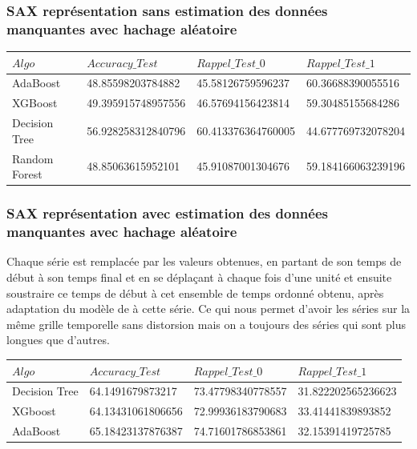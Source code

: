 \documentclass[french]{report}
\begin{document}
\subsubsection{SAX représentation sans estimation des données manquantes avec hachage aléatoire}
\begin{table}[H]
	\begin{tabular} {|l|l|l|l|}%
		\hline
		$Algo$ & $Accuracy\_Test$ & $Rappel\_Test\_0 $ & $Rappel\_Test\_1$\\
		\hline
		AdaBoost & 48.85598203784882 & 45.58126759596237 & 60.36688390055516 \\
		\hline
		XGBoost & 49.395915748957556 & 46.57694156423814 & 59.30485155684286 \\
		\hline
		Decision Tree & 56.928258312840796 & 60.413376364760005 & 44.677769732078204 \\
		\hline
		Random Forest & 48.85063615952101 & 45.91087001304676 & 59.184166063239196 \\		
		\hline
	\end{tabular}
\end{table}

\subsubsection{SAX représentation avec estimation des données manquantes avec hachage aléatoire}
Chaque série est remplacée par les valeurs obtenues, en partant de son temps de début à son temps final et en se déplaçant à chaque fois d'une unité et ensuite soustraire ce temps de début à cet ensemble de temps ordonné obtenu, après adaptation du modèle de \cite{bazin} à cette série. Ce qui nous permet d'avoir les séries sur la même grille temporelle sans distorsion mais on a toujours des séries qui sont plus longues que d'autres.      
\begin{table}[H]
	\begin{tabular} {|l|l|l|l|}%
		\hline
		$Algo$ & $Accuracy\_Test$ & $Rappel\_Test\_0 $ & $Rappel\_Test\_1$\\
		\hline
		Decision Tree & 64.1491679873217 & 73.47798340778557 & 31.822202565236623 \\
		\hline
		XGboost & 64.13431061806656 & 72.99936183790683 & 33.41441839893852 \\
		\hline
		AdaBoost & 65.18423137876387 &  74.71601786853861 & 32.15391419725785 \\
		\hline
	\end{tabular}
\end{table}
\end{document}
